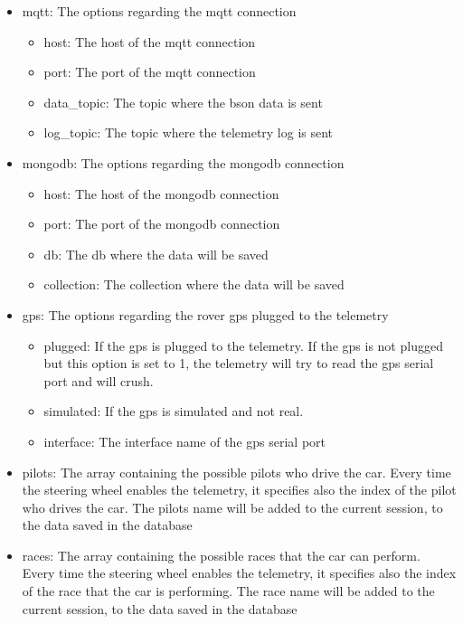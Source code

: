\begin{itemize}
    \item mqtt: The options regarding the mqtt connection
        \begin{itemize}
            \item host: The host of the mqtt connection
            \item port: The port of the mqtt connection
            \item data\_topic: The topic where the bson data is sent
            \item log\_topic: The topic where the telemetry log is sent
        \end{itemize}
    \item mongodb: The options regarding the mongodb connection
        \begin{itemize}
            \item host: The host of the mongodb connection
            \item port: The port of the mongodb connection
            \item db: The db where the data will be saved
            \item collection: The collection where the data will be saved
        \end{itemize}
    \item gps: The options regarding the rover gps plugged to the telemetry
        \begin{itemize}
            \item plugged: If the gps is plugged to the telemetry. If the gps is not plugged but this option is set to 1, the telemetry will try to read the gps serial port and will crush.
            \item simulated: If the gps is simulated and not real.
            \item interface: The interface name of the gps serial port
        \end{itemize}
    \item pilots: The array containing the possible pilots who drive the car. Every time the steering wheel enables the telemetry, it specifies also the index of the pilot who drives the car. The pilots name will be added to the current session, to the data saved in the database
    \item races: The array containing the possible races that the car can perform. Every time the steering wheel enables the telemetry, it specifies also the index of the race that the car is performing. The race name will be added to the current session, to the data saved in the database

\end{itemize}
